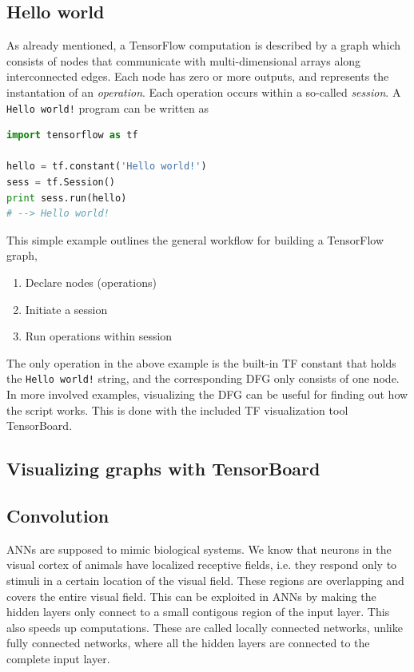 \documentclass[twoside,english]{uiofysmaster}
\begin{document}
\subsection{Hello world}
As already mentioned, a TensorFlow computation
is described by a graph which consists of nodes
that communicate with multi-dimensional arrays along
interconnected edges. Each node has zero or more
outputs, and represents the instantation
of an \textit{operation}. Each operation
occurs within a so-called \textit{session}. 
A \texttt{Hello world!} program can be written as
\begin{lstlisting}[language=python]
import tensorflow as tf

hello = tf.constant('Hello world!')
sess = tf.Session()
print sess.run(hello)
# --> Hello world!
\end{lstlisting}
This simple example outlines the general
workflow for building a TensorFlow graph,
\begin{enumerate}
 \item Declare nodes (operations)
 \item Initiate a session
 \item Run operations within session
\end{enumerate}
The only operation in the above example
is the built-in TF constant that holds the 
\texttt{Hello world!} string, and the 
corresponding DFG only consists of one node. 
In more involved examples, visualizing 
the DFG can be useful for finding out how 
the script works. This is done with the 
included TF visualization tool TensorBoard.

\subsection{Visualizing graphs with TensorBoard}



\subsection{Convolution}
ANNs are supposed to mimic biological systems. We know that neurons in the visual cortex of animals have
localized receptive fields, i.e. they respond only to stimuli in a certain location of the visual field. 
These regions are overlapping and covers the entire visual field. This can be exploited in ANNs by making the hidden layers
only connect to a small contigous region of the input layer. This also speeds up computations. These are called
locally connected networks, unlike fully connected networks, where all the hidden layers are connected to the complete
input layer. 
\end{document}
